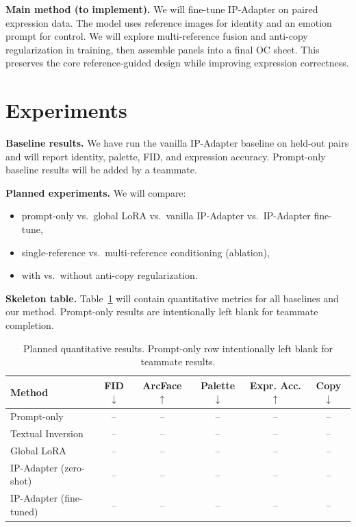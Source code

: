 \documentclass[twocolumn,11pt]{article}
\begin{document}
\textbf{Main method (to implement).} We will fine-tune IP-Adapter on paired expression data. The model uses reference images for identity and an emotion prompt for control. We will explore multi-reference fusion and anti-copy regularization in training, then assemble panels into a final OC sheet. This preserves the core reference-guided design while improving expression correctness.

\section{Experiments}
\textbf{Baseline results.} We have run the vanilla IP-Adapter baseline on held-out pairs and will report identity, palette, FID, and expression accuracy. Prompt-only baseline results will be added by a teammate.

\textbf{Planned experiments.} We will compare:
\begin{itemize}[leftmargin=*,nosep]
    \item prompt-only vs.\ global LoRA vs.\ vanilla IP-Adapter vs.\ IP-Adapter fine-tune,
    \item single-reference vs.\ multi-reference conditioning (ablation),
    \item with vs.\ without anti-copy regularization.
\end{itemize}

\textbf{Skeleton table.} Table~\ref{tab:results} will contain quantitative metrics for all baselines and our method. Prompt-only results are intentionally left blank for teammate completion.

\begin{table}[h]
    \centering
    \small
    \begin{tabular}{|l|c|c|c|c|c|}
        \hline
        \textbf{Method} & \textbf{FID} $\downarrow$ & \textbf{ArcFace} $\uparrow$ & \textbf{Palette} $\downarrow$ & \textbf{Expr. Acc.} $\uparrow$ & \textbf{Copy} $\downarrow$ \\
        \hline
        Prompt-only & -- & -- & -- & -- & -- \\
        Textual Inversion & -- & -- & -- & -- & -- \\
        Global LoRA & -- & -- & -- & -- & -- \\
        IP-Adapter (zero-shot) & -- & -- & -- & -- & -- \\
        IP-Adapter (fine-tuned) & -- & -- & -- & -- & -- \\
        \hline
    \end{tabular}
    \caption{Planned quantitative results. Prompt-only row intentionally left blank for teammate results.}
    \label{tab:results}
\end{table}
\end{document}
